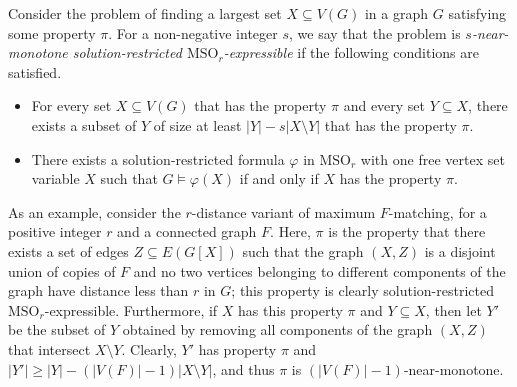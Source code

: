 \documentclass[a4paper,11pt]{article}
\begin{document}
Consider the problem of finding a largest set $X\subseteq V(G)$ in a graph $G$ satisfying some property $\pi$.
For a non-negative integer $s$, we say that the problem is \emph{$s$-near-monotone solution-restricted $\text{MSO}_r$-expressible} if
the following conditions are satisfied.
\begin{itemize}
\item For every set $X\subseteq V(G)$ that has the property $\pi$ and every set $Y\subseteq X$,
there exists a subset of $Y$ of size at least $|Y|-s|X\setminus Y|$ that has the property $\pi$.
\item There exists a solution-restricted formula $\varphi$ in $\text{MSO}_r$ with one free vertex set variable $X$
such that $G\models \varphi(X)$ if and only if $X$ has the property $\pi$.
\end{itemize}
As an example, consider the $r$-distance variant of maximum $F$-matching, for a positive integer $r$ and a connected graph $F$.
Here, $\pi$ is the property that there exists a set of edges $Z\subseteq E(G[X])$ such that the graph $(X,Z)$ is a disjoint union
of copies of $F$ and no two vertices belonging to different components of the graph have distance less than $r$ in $G$;
this property is clearly solution-restricted $\text{MSO}_r$-expressible.  Furthermore, if $X$ has this property $\pi$
and $Y\subseteq X$, then let $Y'$ be the subset of $Y$ obtained by removing all components of the graph $(X,Z)$ that intersect $X\setminus Y$.
Clearly, $Y'$ has property $\pi$ and $|Y'|\ge |Y|-(|V(F)|-1)|X\setminus Y|$, and thus $\pi$ is $(|V(F)|-1)$-near-monotone.
\end{document}
